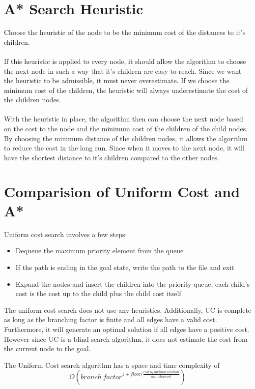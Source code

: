 \documentclass[12pt]{article}
\begin{document}
    \section{A* Search Heuristic}

    Choose the heuristic of the node to be the minimum cost of the distances to it's children.\\
    \\
    If this heuristic is applied to every node, it should allow the algorithm to choose the next node in such a way that it's children are easy to reach. Since we want the heuristic to be admissible, it must never overestimate. If we choose the minimum cost of the children, the heuristic will always underestimate the cost of the children nodes.\\
    \\
    With the heuristic in place, the algorithm then can choose the next node based on the cost to the node and the minimum cost of the children of the child nodes. By choosing the minimum distance of the children nodes, it allows the algorithm to reduce the cost in the long run. Since when it moves to the next node, it will have the shortest distance to it's children compared to the other nodes.

    \section{Comparision of Uniform Cost and A*}

    Uniform cost search involves a few steps:
    \begin{itemize}
        \item Dequeue the maximum priority element from the queue
        \item If the path is ending in the goal state, write the path to the file and exit
        \item Expand the nodes and insert the children into the priority queue, each child's cost is the cost up to the child plus the child cost itself
    \end{itemize}
    The uniform cost search does not use any heuristics. Additionally, UC is complete as long as the branching factor is finite and all edges have a valid cost. Furthermore, it will generate an optimal solution if all edges have a positive cost. However since UC is a blind search algorithm, it does not estimate the cost from the current node to the goal.

    The Uniform Cost search algorithm has a space and time complexity of $$O(branch\ factor^{1 + floor(\frac{cost\ of\ optimal\ solution}{min\ step\ cost}})$$
\end{document}
